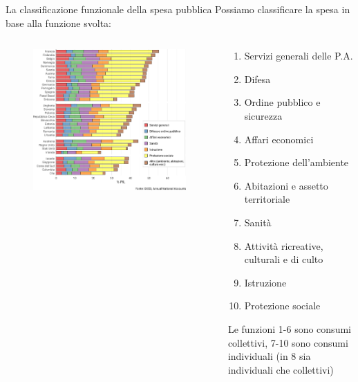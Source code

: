 \documentclass[11pt,italian]{beamer}
\begin{document}
\begin{frame}{La classificazione funzionale della spesa pubblica}
Possiamo classificare la spesa in base alla funzione svolta:

\begin{columns}
\begin{column}{.65\columnwidth}
\begin{figure}
\centering
\includegraphics[width=\textwidth]{./figure/spesa-pubblica-per-funzioni-2019-orizz-color.pdf}
\end{figure}
\end{column}

\begin{column}{.35\columnwidth}
\footnotesize
\begin{enumerate}
\item Servizi generali delle P.A.
\item Difesa
\item Ordine pubblico e sicurezza
\item Affari economici
\item Protezione dell’ambiente
\item Abitazioni e assetto territoriale
\item Sanità
\item Attività ricreative, culturali e di culto
\item Istruzione
\item Protezione sociale
\end{enumerate}
Le funzioni 1-6 sono consumi collettivi, 7-10 sono consumi individuali (in 8 sia individuali che collettivi)
\end{column}
\end{columns}
\end{frame}
\end{document}
